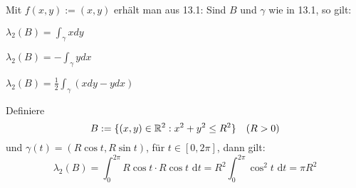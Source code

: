 \documentclass[a4paper,twoside,DIV15,BCOR12mm,chapterprefix=true,headings=onelinechapter]{scrbook}
\begin{document}
\begin{folgerung}
Mit $f(x,y) := (x,y)$ erhält man aus 13.1: Sind $B$ und $\gamma$ wie in 13.1, so gilt:
\begin{liste}
\item $\lambda_2(B) = \int_\gamma xdy$
\item $\lambda_2(B) = -\int_\gamma ydx$
\item $\lambda_2(B) = \frac12\int_\gamma (xdy - ydx)$
\end{liste}
\end{folgerung}

\begin{beispiel}
Definiere
\[B:= \{(x,y)\in\mathbb{R}^2:x^2+y^2 \le R^2\}\quad (R>0)\]
und $\gamma(t) = (R\cos t,R\sin t)$, für $t\in[0,2\pi]$, dann gilt:
\[\lambda_2(B) = \int_0^{2\pi} R\cos t\cdot R\cos t \text{ d}t = R^2\int_0^{2\pi} \cos^2t \text{ d}t = \pi R^2\]
\end{beispiel}
\end{document}
